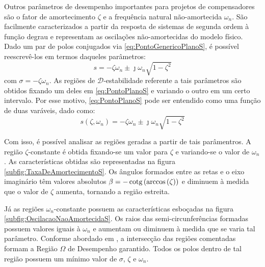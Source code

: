 Outros parâmetros de desempenho importantes para projetos de compensadores são o fator de amortecimento $\zeta$ e a frequência natural não-amortecida $\omega_n$. São facilmente caracterizados a partir da resposta de sistemas de segunda ordem à função degrau\cite{NISE2011,OGATA2011} e representam as oscilações não-amortecidas do modelo físico. Dado um par de polos conjugados via \eqref{eq:PontoGenericoPlanoS}, é possível reescrevê-los em termos daqueles parâmetros:
\begin{equation}
  s = -\zeta\omega_n \pm \jmath\omega_n \sqrt {1-\zeta^2} \label{eq:PontoPlanoS}
\end{equation}
com $\sigma = -\zeta\omega_n$. As regiões de $\mathscr{D}$-estabilidade referente a tais parâmetros são obtidos fixando um deles em \eqref{eq:PontoPlanoS} e variando o outro em um certo intervalo. Por esse motivo, \eqref{eq:PontoPlanoS} pode ser entendido como uma função de duas varáveis, dado como:
\begin{equation}
  s(\zeta,\omega_n) = -\zeta\omega_n \pm \jmath\omega_n \sqrt {1-\zeta^2} \label{eq:FuncaoPontoPlanoS}
\end{equation}

Com isso, é possível analisar as regiões geradas a partir de tais parâmentros. A região $\zeta$-constante é obtida fixando-se um valor para $\zeta$ e variando-se o valor de $\omega_n$. As características obtidas são representadas na figura \ref{subfig:TaxaDeAmortecimentoS}. Os ângulos formados entre as retas e o eixo imaginário têm valores absolutos $\beta = -\operatorname{cotg}{\left(\arccos{\left(\zeta\right)}\right)}$ e diminuem à medida que o valor de $\zeta$ aumenta, tornando a região estreita.

Já as regiões $\omega_n$-constante possuem as características esboçadas na figura \ref{subfig:OscilacaoNaoAmortecidaS}. Os raios das semi-circunferências formadas possuem valores iguais à $\omega_n$ e aumentam ou diminuem à medida que se varia tal parâmetro. Conforme abordado em , a intersecção das regiões comentadas formam a Região $\Omega$ de Desempenho garantido. Todos os polos dentro de tal região possuem um mínimo valor de $\sigma$, $\zeta$ e $\omega_n$.

